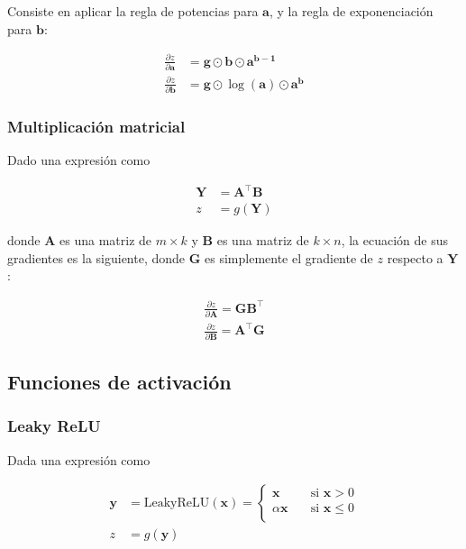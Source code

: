 \documentclass{article}
\begin{document}
Consiste en aplicar la regla de potencias para $\bm{a}$, y la regla de exponenciación para $\bm{b}$:

\begin{align*}
	\frac{\partial z}{\partial \bm{a}} &= \bm{g} \odot \bm{b} \odot \bm{a}^{\bm{b} - \bm{1}} \\
	\frac{\partial z}{\partial \bm{b}} &= \bm{g} \odot \log(\bm{a}) \odot \bm{a}^{\bm{b}}
\end{align*}

\newpage

\subsubsection*{Multiplicación matricial}

Dado una expresión como

\begin{align*}
	\bm{Y} &= \bm{A^{\intercal}} \bm{B} \\
	z &= g(\bm{Y})
\end{align*}

donde $\bm{A}$ es una matriz de $m \times k$ y $\bm{B}$ es una matriz de $k \times n$,
la ecuación de sus gradientes es la siguiente, donde $\bm{G}$ es simplemente el gradiente de $z$ respecto a $\bm{Y}$:

\begin{align*}
	\frac{\partial z}{\partial \bm{A}} = \bm{G} \bm{B^{\intercal}} \\
	\frac{\partial z}{\partial \bm{B}} = \bm{A^{\intercal}} \bm{G}
\end{align*}

\subsection{Funciones de activación}
\subsubsection*{Leaky ReLU}

Dada una expresión como

\begin{align*}
	\bm{y} &= \text{LeakyReLU}(\bm{x}) = \begin{cases}
		\bm{x} \quad &\text{si } \bm{x} > 0 \\
		\alpha \bm{x} \quad &\text{si } \bm{x} \leq 0 \\
	\end{cases} \\
	z &= g(\bm{y})
\end{align*}
\end{document}
